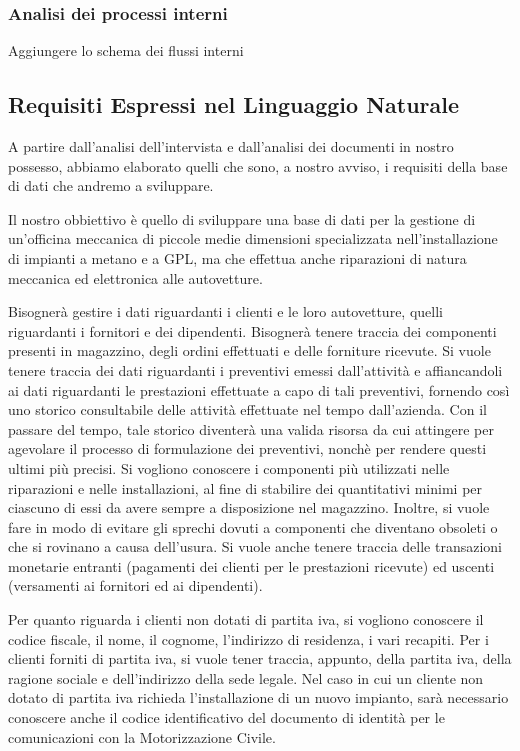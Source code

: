 		\subsubsection{Analisi dei processi interni}
			Aggiungere lo schema dei flussi interni
		
	\subsection{Requisiti Espressi nel Linguaggio Naturale}
	
		A partire dall’analisi dell’intervista e dall’analisi dei documenti in nostro possesso, abbiamo elaborato quelli che sono, a nostro avviso, i requisiti della base di dati che andremo a sviluppare.
		
		Il nostro obbiettivo è quello di sviluppare una base di dati per la gestione di un’officina meccanica di piccole medie dimensioni specializzata nell’installazione di impianti a metano e a GPL, ma che effettua anche riparazioni di natura meccanica ed elettronica alle autovetture.
		
		Bisognerà gestire i dati riguardanti i clienti e le loro autovetture, quelli riguardanti i fornitori e dei dipendenti. Bisognerà tenere traccia dei componenti presenti in magazzino, degli ordini effettuati e delle forniture ricevute.
		Si vuole tenere traccia dei dati riguardanti i preventivi emessi dall'attività e affiancandoli ai dati riguardanti le prestazioni effettuate a capo di tali preventivi, fornendo così uno storico consultabile delle attività effettuate nel tempo dall'azienda. Con il passare del tempo, tale storico diventerà una valida risorsa da cui attingere per agevolare il processo di formulazione dei preventivi, nonchè per rendere questi ultimi più precisi.
		Si vogliono conoscere i componenti più utilizzati nelle riparazioni e nelle installazioni, al fine di stabilire dei quantitativi minimi per ciascuno di essi da avere sempre a disposizione nel magazzino. Inoltre, si vuole fare in modo di evitare gli sprechi dovuti a componenti che diventano obsoleti o che si rovinano a causa dell'usura.
		Si vuole anche tenere traccia delle transazioni monetarie entranti (pagamenti dei clienti per le prestazioni ricevute) ed uscenti (versamenti ai fornitori ed ai dipendenti).
		
		Per quanto riguarda i clienti non dotati di partita iva, si vogliono conoscere il codice fiscale, il nome, il cognome, l’indirizzo di residenza, i vari recapiti. Per i clienti forniti di partita iva, si vuole tener traccia, appunto, della partita iva, della ragione sociale e dell’indirizzo della sede legale. 
		Nel caso in cui un cliente non dotato di partita iva richieda l’installazione di un nuovo impianto, sarà necessario conoscere anche il codice identificativo del documento di identità per le comunicazioni con la Motorizzazione Civile.
		
